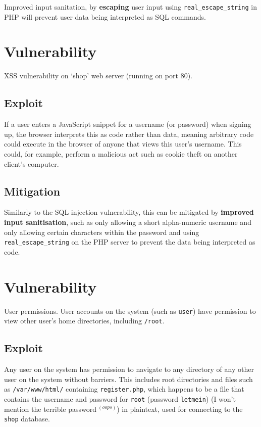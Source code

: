 \documentclass[11pt]{article}
\begin{document}
Improved input sanitation, by \textbf{escaping} user input using \texttt{real\_escape\_string} in PHP will prevent user data being interpreted as SQL commands.

\section{Vulnerability}

XSS vulnerability on `shop' web server (running on port 80).

\subsection{Exploit}

If a user enters a JavaScript snippet for a username (or password) when signing up, the browser interprets this as code rather than data, meaning arbitrary code could execute in the browser of anyone that views this user's username. This could, for example, perform a malicious act such as cookie theft on another client's computer.

\subsection{Mitigation}

Similarly to the SQL injection vulnerability, this can be mitigated by \textbf{improved input sanitisation}, such as only allowing a short alpha-numeric username and only allowing certain characters within the password and using \texttt{real\_escape\_string} on the PHP server to prevent the data being interpreted as code.

\section{Vulnerability}

User permissions. User accounts on the system (such as \texttt{user}) have permission to view other user's home directories, including \texttt{/root}.

\subsection{Exploit}

Any user on the system has permission to navigate to any directory of any other user on the system without barriers. This includes root directories and files such as \texttt{/var/www/html/} containing \texttt{register.php}, which happens to be a file that contains the username and password for \texttt{root} (password \texttt{letmein}) (I won't mention the terrible password$\:^{(oops)}$) in plaintext, used for connecting to the \texttt{shop} database.
\end{document}
